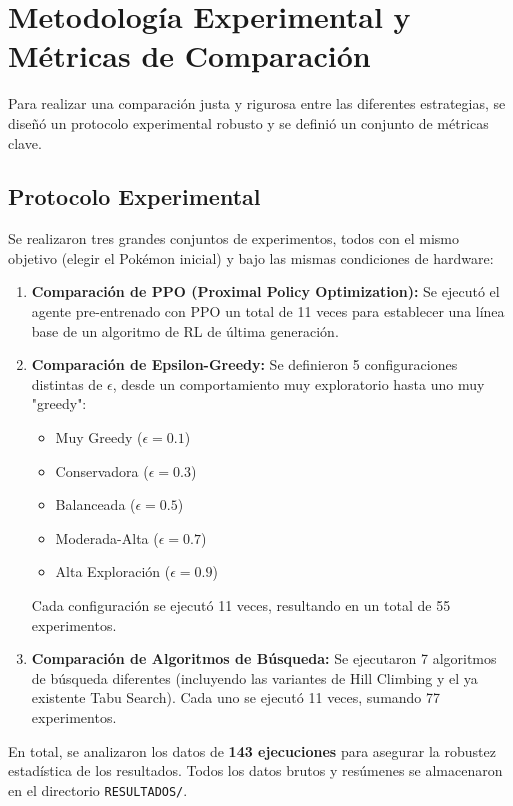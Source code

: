 \documentclass[12pt, oneside, openany]{book}
\begin{document}
\section{Metodología Experimental y Métricas de Comparación}
\label{sec:metodologia}

Para realizar una comparación justa y rigurosa entre las diferentes estrategias, se diseñó un protocolo experimental robusto y se definió un conjunto de métricas clave.

\subsection{Protocolo Experimental}
Se realizaron tres grandes conjuntos de experimentos, todos con el mismo objetivo (elegir el Pokémon inicial) y bajo las mismas condiciones de hardware:
\begin{enumerate}
    \item \textbf{Comparación de PPO (Proximal Policy Optimization):} Se ejecutó el agente pre-entrenado con PPO un total de 11 veces para establecer una línea base de un algoritmo de RL de última generación.
    \item \textbf{Comparación de Epsilon-Greedy:} Se definieron 5 configuraciones distintas de $\epsilon$, desde un comportamiento muy exploratorio hasta uno muy "greedy":
    \begin{itemize}
        \item Muy Greedy ($\epsilon=0.1$)
        \item Conservadora ($\epsilon=0.3$)
        \item Balanceada ($\epsilon=0.5$)
        \item Moderada-Alta ($\epsilon=0.7$)
        \item Alta Exploración ($\epsilon=0.9$)
    \end{itemize}
    Cada configuración se ejecutó 11 veces, resultando en un total de 55 experimentos.
    \item \textbf{Comparación de Algoritmos de Búsqueda:} Se ejecutaron 7 algoritmos de búsqueda diferentes (incluyendo las variantes de Hill Climbing y el ya existente Tabu Search). Cada uno se ejecutó 11 veces, sumando 77 experimentos.
\end{enumerate}
En total, se analizaron los datos de \textbf{143 ejecuciones} para asegurar la robustez estadística de los resultados. Todos los datos brutos y resúmenes se almacenaron en el directorio \texttt{RESULTADOS/}.
\end{document}
